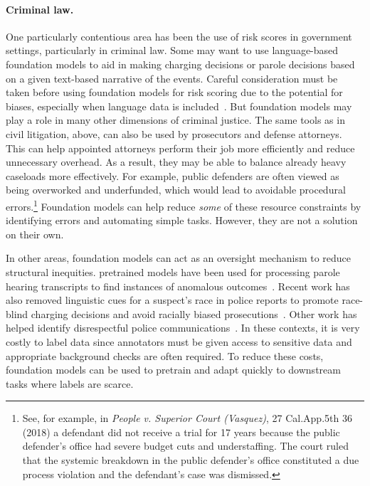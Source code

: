 \paragraph{Criminal law.} One particularly contentious area has been the use of risk scores in government settings, particularly in criminal law. Some may want to use language-based foundation models to aid in making charging decisions or parole decisions based on a given text-based narrative of the events. Careful consideration must be taken before using foundation models for risk scoring due to the potential for biases, especially when language data is included~\citep{bender2021,berk2021justice,laufer2020feedback}. But foundation models may play a role in many other dimensions of criminal justice. 
The same tools as in civil litigation, above, can also be used by prosecutors and defense attorneys. This can help appointed attorneys perform their job more efficiently and reduce unnecessary overhead. As a result, they may be able to balance already heavy caseloads more effectively. For example, public defenders are often viewed as being overworked and underfunded, which would lead to avoidable procedural errors.\footnote{See, for example, in \textit{People v. Superior Court (Vasquez)}, 27 Cal.App.5th 36 (2018) a defendant did not receive a trial for 17 years because the public defender's office had severe budget cuts and understaffing. The court ruled that the systemic breakdown in the public defender's office constituted a due process violation and the defendant's case was dismissed.} Foundation models can help reduce \textit{some} of these resource constraints by identifying errors and automating simple tasks. However, they are not a solution on their own.

In other areas, foundation models can act as an oversight mechanism to reduce structural inequities. pretrained models have been used for processing parole hearing transcripts to find instances of anomalous outcomes~\citep{bell2021recon}. Recent work has also removed linguistic cues for a suspect's race in police reports to promote race-blind charging decisions and avoid racially biased prosecutions~\citep{chohlas2020blind}. Other work has helped identify disrespectful police communications~\citep{voigt2017language}. 
In these contexts, it is very costly to label data since annotators must be given access to sensitive data and appropriate background checks are often required. To reduce these costs, foundation models can be used to pretrain and adapt quickly to downstream tasks where labels are scarce. 

